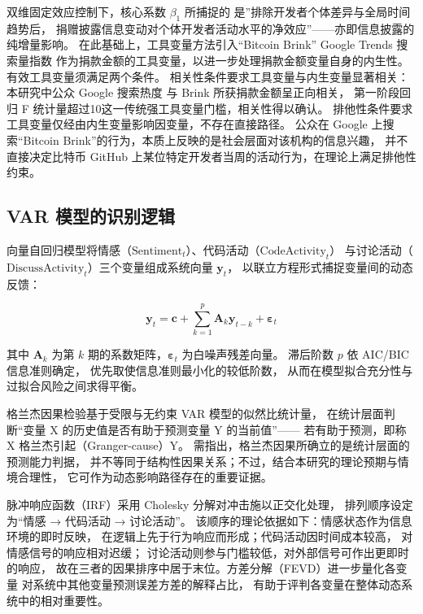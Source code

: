 \documentclass[
    type = master, %
    degree = professional,        %
    decl-page,  %
    twoside,                %
    fontset = fandol %
  ]{njuthesis}
\begin{document}
双维固定效应控制下，核心系数 $\beta_1$ 所捕捉的
是”排除开发者个体差异与全局时间趋势后，
捐赠披露信息变动对个体开发者活动水平的净效应”——亦即信息披露的纯增量影响。
在此基础上，工具变量方法引入“Bitcoin Brink” Google Trends 搜索量指数
作为捐款金额的工具变量，以进一步处理捐款金额变量自身的内生性。
有效工具变量须满足两个条件。
相关性条件要求工具变量与内生变量显著相关：本研究中公众 Google 搜索热度
与 Brink 所获捐款金额呈正向相关，
第一阶段回归 F 统计量超过10这一传统强工具变量门槛，相关性得以确认。
排他性条件要求工具变量仅经由内生变量影响因变量，不存在直接路径。
公众在 Google 上搜索“Bitcoin Brink”的行为，本质上反映的是社会层面对该机构的信息兴趣，
并不直接决定比特币 GitHub 上某位特定开发者当周的活动行为，在理论上满足排他性约束。

\subsection{VAR 模型的识别逻辑}

向量自回归模型将情感（$\text{Sentiment}_t$）、代码活动（$\text{CodeActivity}_t$）
与讨论活动（$\text{DiscussActivity}_t$）三个变量组成系统向量 $\mathbf{y}_t$，
以联立方程形式捕捉变量间的动态反馈：

\begin{equation}
\label{eq:var-overview}
\mathbf{y}_t = \mathbf{c} + \sum_{k=1}^{p} \mathbf{A}_k \mathbf{y}_{t-k} + \boldsymbol{\varepsilon}_t
\end{equation}

其中 $\mathbf{A}_k$ 为第 $k$ 期的系数矩阵，$\boldsymbol{\varepsilon}_t$ 为白噪声残差向量。
滞后阶数 $p$ 依 AIC/BIC 信息准则确定，
优先取使信息准则最小化的较低阶数，
从而在模型拟合充分性与过拟合风险之间求得平衡。

格兰杰因果检验基于受限与无约束 VAR 模型的似然比统计量，
在统计层面判断“变量 X 的历史值是否有助于预测变量 Y 的当前值”——
若有助于预测，即称 X 格兰杰引起（Granger-cause）Y。
需指出，格兰杰因果所确立的是统计层面的预测能力判据，
并不等同于结构性因果关系；不过，结合本研究的理论预期与情境合理性，
它可作为动态影响路径存在的重要证据。

脉冲响应函数（IRF）采用 Cholesky 分解对冲击施以正交化处理，
排列顺序设定为“情感 → 代码活动 → 讨论活动”。
该顺序的理论依据如下：情感状态作为信息环境的即时反映，
在逻辑上先于行为响应而形成；代码活动因时间成本较高，
对情感信号的响应相对迟缓；
讨论活动则参与门槛较低，对外部信号可作出更即时的响应，
故在三者的因果排序中居于末位。方差分解（FEVD）进一步量化各变量
对系统中其他变量预测误差方差的解释占比，
有助于评判各变量在整体动态系统中的相对重要性。
\end{document}
